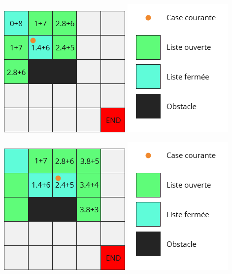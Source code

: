 \documentclass[11pt]{beamer}
\begin{document}
		\begin{frame}
			\begin{center}
				\includegraphics[scale=0.5]{images/Algo_4.png}
				\hspace{1cm}
				\includegraphics[scale=0.5]{images/Legend.png}
			\end{center}
		\end{frame}
		\begin{frame}
			\begin{center}
				\includegraphics[scale=0.5]{images/Algo_5.png}
				\hspace{1cm}
				\includegraphics[scale=0.5]{images/Legend.png}
			\end{center}
		\end{frame}
\end{document}
